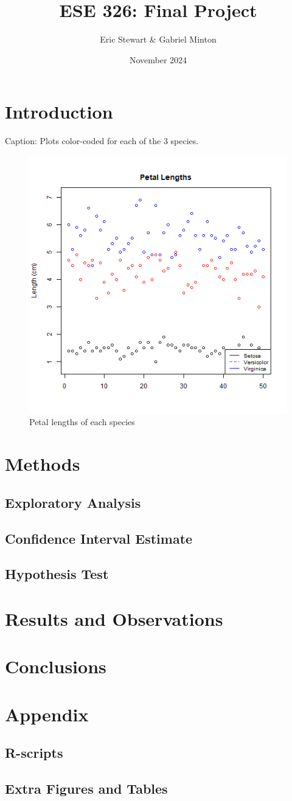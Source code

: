 \documentclass{article}
\title{ESE 326: Final Project}
\author{Eric Stewart \& Gabriel Minton}
\date{November 2024}
\begin{document}
\maketitle

\section{Introduction}

\color{Aquamarine}
Caption: Plots color-coded for each of the 3 species.

\begin{figure}[H]
	\centering
	\includegraphics[width=.5\textwidth]{petal_length.png}
	\caption{Petal lengths of each species}
\end{figure}


\section{Methods}

\subsection{Exploratory Analysis}
\subsection{Confidence Interval Estimate}
\subsection{Hypothesis Test}

\color{orange}
\section{Results and Observations}

\section{Conclusions}

\section{Appendix}

\subsection{R-scripts}
\subsection{Extra Figures and Tables} 
\end{document}
